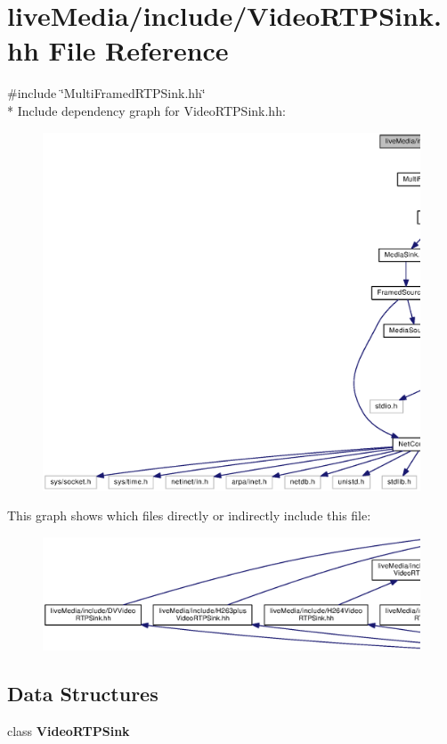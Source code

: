 \section{live\+Media/include/\+Video\+R\+T\+P\+Sink.hh File Reference}
\label{VideoRTPSink_8hh}
{\ttfamily \#include \char`\"{}Multi\+Framed\+R\+T\+P\+Sink.\+hh\char`\"{}}\\*
Include dependency graph for Video\+R\+T\+P\+Sink.\+hh\+:
\nopagebreak
\begin{figure}[H]
\begin{center}
\leavevmode
\includegraphics[width=350pt]{VideoRTPSink_8hh__incl}
\end{center}
\end{figure}
This graph shows which files directly or indirectly include this file\+:
\nopagebreak
\begin{figure}[H]
\begin{center}
\leavevmode
\includegraphics[width=350pt]{VideoRTPSink_8hh__dep__incl}
\end{center}
\end{figure}
\subsection*{Data Structures}
\begin{DoxyCompactItemize}
\item 
class {\bf Video\+R\+T\+P\+Sink}
\end{DoxyCompactItemize}
